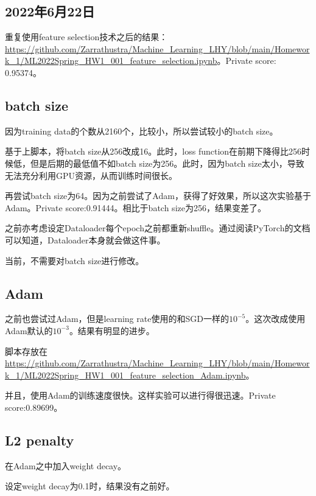 \documentclass{article}
\begin{document}
\begin{CJK}{UTF8}{gbsn}

\section{2022年6月22日}

重复使用feature selection技术之后的结果：\url{https://github.com/Zarrathustra/Machine_Learning_LHY/blob/main/Homework_1/ML2022Spring_HW1_001_feature_selection.ipynb}。Private score: 0.95374。

\subsection{batch size}

因为training data的个数从2160个，比较小，所以尝试较小的batch size。

基于上脚本，将batch size从256改成16。此时，loss function在前期下降得比256时候低，但是后期的最低值不如batch size为256。此时，因为batch size太小，导致无法充分利用GPU资源，从而训练时间很长。

再尝试batch size为64。因为之前尝试了Adam，获得了好效果，所以这次实验基于Adam。Private score:0.91444。相比于batch size为256，结果变差了。

之前亦考虑设定Dataloader每个epoch之前都重新shuffle。通过阅读PyTorch的文档可以知道，Dataloader本身就会做这件事。

当前，不需要对batch size进行修改。

\subsection{Adam}

之前也尝试过Adam，但是learning rate使用的和SGD一样的$10^{-5}$。这次改成使用Adam默认的$10^{-3}$。结果有明显的进步。

脚本存放在\url{https://github.com/Zarrathustra/Machine_Learning_LHY/blob/main/Homework_1/ML2022Spring_HW1_001_feature_selection_Adam.ipynb}。

并且，使用Adam的训练速度很快。这样实验可以进行得很迅速。Private score:0.89699。

\subsection{L2 penalty}\label{sec:L2_penalty}

在Adam之中加入weight decay。

设定weight decay为0.1时，结果没有之前好。


\end{CJK}
\end{document}
